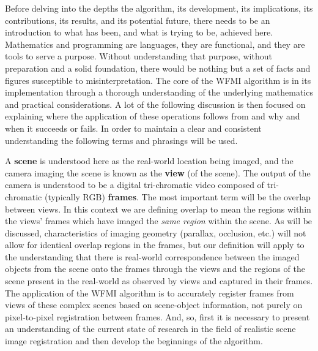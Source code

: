 %
%
%
%
%
%
%
%
%

%
%
%


Before delving into the depths the algorithm, its development, its implications, its contributions, its results, and its potential future, there needs to be an introduction to what has been, and what is trying to be, achieved here. Mathematics and programming are languages, they are functional, and they are tools to serve a purpose. Without understanding that purpose, without preparation and a solid foundation, there would be nothing but a set of facts and figures susceptible to misinterpretation. The core of the WFMI algorithm is in its implementation through a thorough understanding of the underlying mathematics and practical considerations. A lot of the following discussion is then focused on explaining where the application of these operations follows from and why and when it succeeds or fails. In order to maintain a clear and consistent understanding the following terms and phrasings will be used.

A \textbf{scene} is understood here as the real-world location being imaged, and the camera imaging the scene is known as the \textbf{view} (of the scene). The output of the camera is understood to be a digital tri-chromatic video composed of tri-chromatic (typically RGB) \textbf{frames}. The most important term will be the overlap between views. In this context we are defining overlap to mean the regions within the views' frames which have imaged the \textit{same region} within the scene. As will be discussed, characteristics of imaging geometry (parallax, occlusion, etc.) will not allow for identical overlap regions in the frames, but our definition will apply to the understanding that there is real-world correspondence between the imaged objects from the scene onto the frames through the views and the regions of the scene present in the real-world as observed by views and captured in their frames. The application of the WFMI algorithm is to accurately register frames from views of these complex scenes based on scene-object information, not purely on pixel-to-pixel registration between frames. And, so, first it is necessary to present an understanding of the current state of research in the field of realistic scene image registration and then develop the beginnings of the algorithm.


